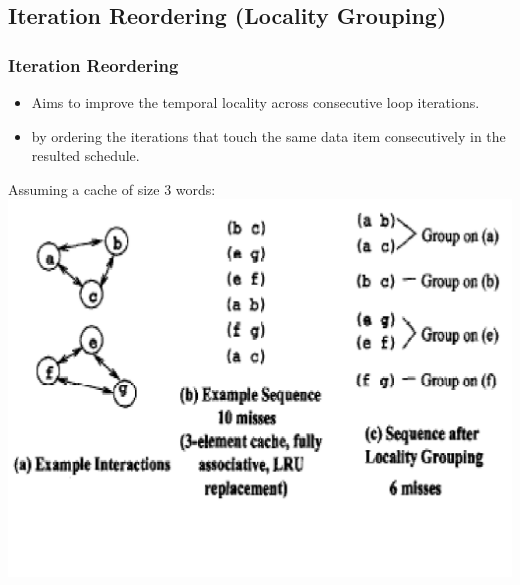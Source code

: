 \documentclass{beamer}
\newcommand{\emphh}[1]{\textcolor{CosGreen}{ #1}}
\begin{document}
\subsection{Iteration Reordering (Locality Grouping)}


\begin{frame}[fragile,t]
  \frametitle{Iteration Reordering}

\begin{itemize}
    \item Aims to improve the \emphh{temporal locality} across 
            consecutive loop iterations.
    \item by ordering the iterations that touch the same
            data item consecutively in the resulted schedule.
\end  {itemize}

Assuming a cache of size 3 words:
\includegraphics[width=54ex]{ParTeaserFigs/CacheMissesEg2}
 
\end{frame}
\end{document}
